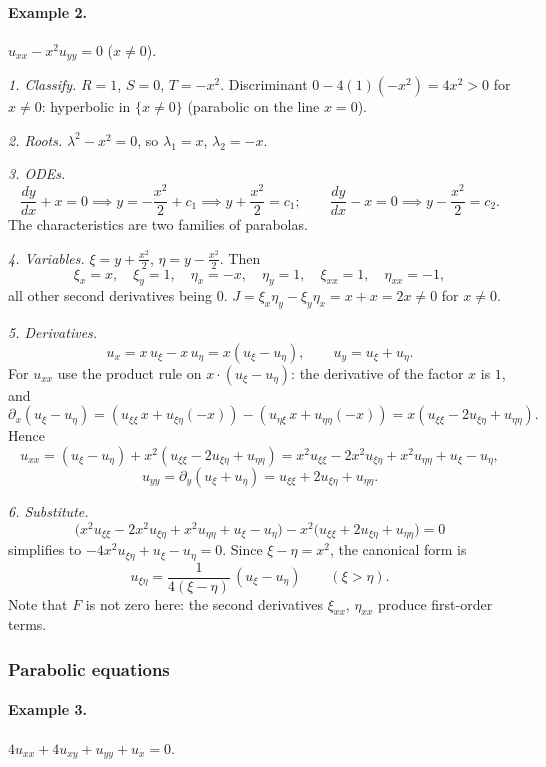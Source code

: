 \documentclass[11pt]{article}
\theoremstyle{plain}
\theoremstyle{definition}
\theoremstyle{remark}
\begin{document}
\paragraph{Example 2.} $u_{xx} - x^2u_{yy} = 0$ \quad ($x \ne 0$).

\emph{1. Classify.} $R = 1$, $S = 0$, $T = -x^2$. Discriminant $0 - 4(1)(-x^2) = 4x^2 > 0$ for $x \neq 0$: hyperbolic in $\{x \neq 0\}$ (parabolic on the line $x = 0$).

\emph{2. Roots.} $\lambda^2 - x^2 = 0$, so $\lambda_1 = x$, $\lambda_2 = -x$.

\emph{3. ODEs.}
$$ \frac{dy}{dx} + x = 0 \implies y = -\frac{x^2}{2} + c_1 \implies y + \frac{x^2}{2} = c_1; \qquad \frac{dy}{dx} - x = 0 \implies y - \frac{x^2}{2} = c_2. $$
The characteristics are two families of parabolas.

\emph{4. Variables.} $\xi = y + \frac{x^2}{2}$, $\eta = y - \frac{x^2}{2}$. Then
$$ \xi_x = x, \quad \xi_y = 1, \quad \eta_x = -x, \quad \eta_y = 1, \quad \xi_{xx} = 1, \quad \eta_{xx} = -1, $$
all other second derivatives being $0$. $J = \xi_x\eta_y - \xi_y\eta_x = x + x = 2x \neq 0$ for $x \neq 0$.

\emph{5. Derivatives.}
$$ u_x = x\,u_\xi - x\,u_\eta = x(u_\xi - u_\eta), \qquad u_y = u_\xi + u_\eta. $$
For $u_{xx}$ use the product rule on $x\cdot(u_\xi - u_\eta)$: the derivative of the factor $x$ is $1$, and
$$ \partial_x(u_\xi - u_\eta) = (u_{\xi\xi}\,x + u_{\xi\eta}(-x)) - (u_{\eta\xi}\,x + u_{\eta\eta}(-x)) = x(u_{\xi\xi} - 2u_{\xi\eta} + u_{\eta\eta}). $$
Hence
$$ u_{xx} = (u_\xi - u_\eta) + x^2(u_{\xi\xi} - 2u_{\xi\eta} + u_{\eta\eta}) = x^2u_{\xi\xi} - 2x^2u_{\xi\eta} + x^2u_{\eta\eta} + u_\xi - u_\eta, $$
$$ u_{yy} = \partial_y(u_\xi + u_\eta) = u_{\xi\xi} + 2u_{\xi\eta} + u_{\eta\eta}. $$

\emph{6. Substitute.}
$$ \big(x^2u_{\xi\xi} - 2x^2u_{\xi\eta} + x^2u_{\eta\eta} + u_\xi - u_\eta\big) - x^2\big(u_{\xi\xi} + 2u_{\xi\eta} + u_{\eta\eta}\big) = 0 $$
simplifies to $-4x^2u_{\xi\eta} + u_\xi - u_\eta = 0$. Since $\xi - \eta = x^2$, the canonical form is
$$ u_{\xi\eta} = \frac{1}{4(\xi - \eta)}\,(u_\xi - u_\eta) \qquad (\xi > \eta). $$
Note that $F$ is not zero here: the second derivatives $\xi_{xx}$, $\eta_{xx}$ produce first-order terms.

\subsubsection{Parabolic equations}

\paragraph{Example 3.} $4u_{xx} + 4u_{xy} + u_{yy} + u_x = 0$.
\end{document}
